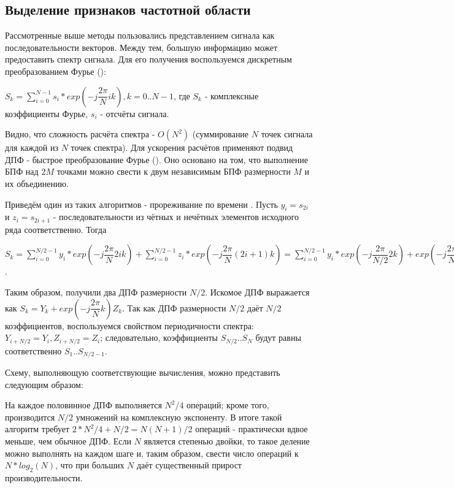 \subsection{Выделение признаков частотной области}

Рассмотренные выше методы пользовались представлением сигнала как последовательности векторов. Между тем, большую информацию может предоставить спектр сигнала. Для его получения воспользуемся дискретным преобразованием Фурье ():

$S_k=\sum_{i=0}^{N-1}s_i*exp(-j\dfrac{2\pi}{N}ik), k=0..N-1$, где $S_k$ - комплексные коэффициенты Фурье, $s_i$ - отсчёты сигнала.


Видно, что сложность расчёта спектра - $O(N^2)$ (суммирование $N$ точек сигнала для каждой из $N$ точек спектра). Для ускорения расчётов применяют подвид ДПФ - быстрое преобразование Фурье (). Оно основано на том, что выполнение БПФ над $2M$ точками можно свести к двум независимым БПФ размерности $M$ и их объединению. 

Приведём один из таких алгоритмов - прореживание по времени \cite{fft_alg}. Пусть $y_i=s_{2i}$ и $z_i=s_{2i+1}$ - последовательности из чётных и нечётных элементов исходного ряда соответственно. Тогда

$S_k=\sum_{i=0}^{N/2-1}y_i*exp(-j\dfrac{2\pi}{N}2ik)+\sum_{i=0}^{N/2-1}z_i*exp(-j\dfrac{2\pi}{N}(2i+1)k)=\sum_{i=0}^{N/2-1}y_i*exp(-j\dfrac{2\pi}{N/2}2k)+exp(-j\dfrac{2\pi}{N}k)\sum_{i=0}^{N/2-1}z_i*exp(-j\dfrac{2\pi}{N/2}ik)$.

Таким образом, получили два ДПФ размерности $N/2$. Искомое ДПФ выражается как 
$S_k=Y_k+exp(-j\dfrac{2\pi}{N}k)Z_k$. Так как ДПФ размерности $N/2$ даёт $N/2$ коэффициентов, воспользуемся свойством периодичности спектра: $Y_{i+N/2}=Y_i, Z_{i+N/2}=Z_i$; следовательно, коэффициенты $S_{N/2}..S_{N}$ будут равны соответственно $S_{1}..S_{N/2-1}$. 

Схему, выполняющую соответствующие вычисления, можно представить следующим образом:


На каждое половинное ДПФ выполняется $N^2/4$ операций; кроме того, производится $N/2$ умножений на комплексную экспоненту. В итоге такой алгоритм требует $2*N^2/4+N/2=N(N+1)/2$ операций - практически вдвое меньше, чем обычное ДПФ. Если $N$ является степенью двойки, то такое деление можно выполнять на каждом шаге и, таким образом, свести число операций к $N*log_2(N)$, что при больших $N$ даёт существенный прирост производительности.

